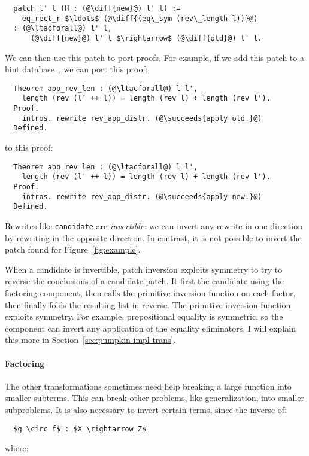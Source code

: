 \begin{lstlisting}
  patch l' l (H : (@\diff{new}@) l' l) :=
    eq_rect_r $\ldots$ (@\diff{(eq\_sym (rev\_length l))}@)
  : (@\ltacforall@) l' l,
      (@\diff{new}@) l' l $\rightarrow$ (@\diff{old}@) l' l.
\end{lstlisting}
We can then use this patch to port proofs.
For example, if we add this patch to a hint database~\cite{hints},
we can port this proof:

\begin{lstlisting}
  Theorem app_rev_len : (@\ltacforall@) l l',
    length (rev (l' ++ l)) = length (rev l) + length (rev l').
  Proof.
    intros. rewrite rev_app_distr. (@\succeeds{apply old.}@)
  Defined.
\end{lstlisting}
to this proof:

\begin{lstlisting}
  Theorem app_rev_len : (@\ltacforall@) l l',
    length (rev (l' ++ l)) = length (rev l) + length (rev l').
  Proof.
    intros. rewrite rev_app_distr. (@\succeeds{apply new.}@)
  Defined.
\end{lstlisting}

Rewrites like \lstinline{candidate} are \textit{invertible}:
we can invert any rewrite in one direction by rewriting in the opposite direction.
In contrast, it is not possible to invert the patch \sysname
found for Figure~\ref{fig:example}.

When a candidate is invertible, patch inversion exploits symmetry to try to reverse the conclusions of a candidate patch.
It first  the candidate using the factoring component, then calls the primitive inversion
function on each factor, then finally folds the resulting list in reverse.
The primitive inversion function exploits symmetry. 
For example, propositional equality is symmetric, so the component can invert any application of the equality eliminators.
I will explain this more in Section~\ref{sec:pumpkin-impl-trans}.

\paragraph{Factoring} The other transformations sometimes need help breaking a large function into smaller subterms.
This can break other problems, like generalization, into smaller subproblems.
It is also necessary to invert certain terms, since the inverse of:

\begin{lstlisting}
  $g \circ f$ : $X \rightarrow Z$
\end{lstlisting}
where:

